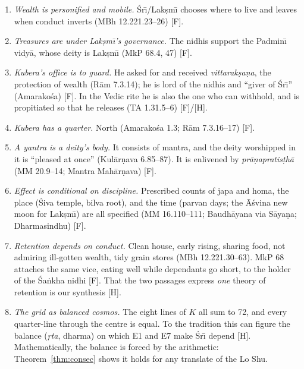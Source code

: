 \documentclass[journal]{IEEEtran}
\theoremstyle{definition}
\newcommand{\Fact}{\textsf{[F]}}
\newcommand{\Hyp}{\textsf{[H]}}
\begin{document}
\begin{enumerate}
\item[E1] \emph{Wealth is personified and mobile.} \'Sr\=\i/Lak\d sm\=\i{} chooses where to live and leaves when conduct inverts (MBh 12.221.23--26) \Fact.
\item[E2] \emph{Treasures are under Lak\d sm\=\i's governance.} The nidhis support the Padmin\=\i{} vidy\=a, whose deity is Lak\d sm\=\i{} (MkP 68.4, 47) \Fact.
\item[E3] \emph{Kubera's office is to guard.} He asked for and received \emph{vittarak\d sa\d na}, the protection of wealth (R\=am 7.3.14); he is lord of the nidhis and ``giver of \'Sr\=\i'' (Amarako\'sa) \Fact. In the Vedic rite he is also the one who can withhold, and is propitiated so that he releases (TA 1.31.5--6) \Fact/\Hyp.
\item[E4] \emph{Kubera has a quarter.} North (Amarako\'sa 1.3; R\=am 7.3.16--17) \Fact.
\item[E5] \emph{A yantra is a deity's body.} It consists of mantra, and the deity worshipped in it is ``pleased at once'' (Kul\=ar\d nava 6.85--87). It is enlivened by \emph{pr\=a\d napratis\d th\=a} (MM 20.9--14; Mantra Mah\=ar\d nava) \Fact.
\item[E6] \emph{Effect is conditional on discipline.} Prescribed counts of japa and homa, the place (\'Siva temple, bilva root), and the time (parvan days; the \=A\'svina new moon for Lak\d sm\=\i) are all specified (MM 16.110--111; Baudh\=ayana via S\=aya\d na; Dharmasindhu) \Fact.
\item[E7] \emph{Retention depends on conduct.} Clean house, early rising, sharing food, not admiring ill-gotten wealth, tidy grain stores (MBh 12.221.30--63). MkP 68 attaches the same vice, eating well while dependants go short, to the holder of the \'Sa\.nkha nidhi \Fact. That the two passages express \emph{one} theory of retention is our synthesis \Hyp.
\item[E8] \emph{The grid as balanced cosmos.} The eight lines of $K$ all sum to 72, and every quarter-line through the centre is equal. To the tradition this can figure the balance (\emph{\d rta}, dharma) on which E1 and E7 make \'Sr\=\i{} depend \Hyp. Mathematically, the balance is forced by the arithmetic: Theorem~\ref{thm:consec} shows it holds for any translate of the Lo Shu.
\end{enumerate}
\end{document}
